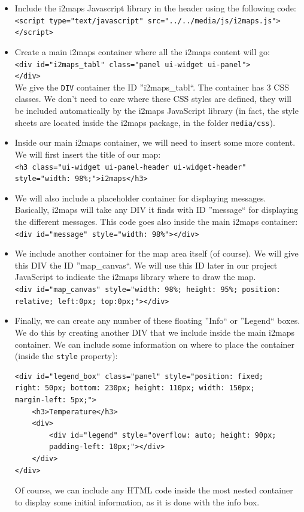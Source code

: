 \documentclass[11pt]{article}
\begin{document}
\begin{itemize}

\item Include the i2maps Javascript library in the header using the following code: \\
\texttt{<script type="text/javascript" src="../../media/js/i2maps.js"></script>}

\item Create a main i2maps container where all the i2maps content will go: \\
\texttt{<div id="i2maps\_tabl" class="panel ui-widget ui-panel"> \\
</div>} \\
We give the \texttt{DIV} container the ID ''i2maps\_tabl``. The container has 3 CSS classes. We don't need to care where these CSS styles are defined, they will be included automatically by the i2maps JavaScript library (in fact, the style sheets are located inside the i2maps package, in the folder \texttt{media/css}).

\item Inside our main i2maps container, we will need to insert some more content. We will first insert the title of our map: \\
\texttt{<h3 class="ui-widget ui-panel-header ui-widget-header" style="width: 98\%;">i2maps</h3>}

\item We will also include a placeholder container for displaying messages. Basically, i2maps will take any DIV it finds with ID ''message`` for displaying the different messages. This code goes also inside the main i2maps container: \\
\texttt{<div id="message" style="width: 98\%"></div>}

\item We include another container for the map area itself (of course). We will give this DIV the ID ''map\_canvas``. We will use this ID later in our project JavaScript to indicate the i2maps library where to draw the map. \\
\texttt{<div id="map\_canvas" style="width: 98\%; height: 95\%; position: relative; left:0px; top:0px;"></div>}

\item Finally, we can create any number of these floating ''Info`` or ''Legend`` boxes. We do this by creating another DIV that we include inside the main i2maps container. We can include some information on where to place the container (inside the \texttt{style} property):
\begin{verbatim}<div id="legend_box" class="panel" style="position: fixed; 
right: 50px; bottom: 230px; height: 110px; width: 150px; 
margin-left: 5px;">
    <h3>Temperature</h3>
    <div>
        <div id="legend" style="overflow: auto; height: 90px; 
        padding-left: 10px;"></div>
    </div>
</div>
\end{verbatim}
Of course, we can include any HTML code inside the most nested container to display some initial information, as it is done with the info box.
\end{itemize}
\end{document}
